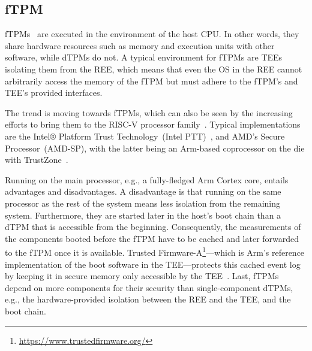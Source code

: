 \subsection{\Acl{fTPM}}



\Acp{fTPM}~\cite{Raj2015, 197213} are executed in the environment of the host CPU\@.
In other words, they share hardware resources such as memory and execution units with other software, while \acp{dTPM} do not.
A typical environment for \acp{fTPM} are \acp{TEE} isolating them from the \ac{REE}, which means that even the OS in the REE cannot arbitrarily access the memory of the \ac{fTPM} but must adhere to the \ac{fTPM}'s and \ac{TEE}'s provided interfaces.

The trend is moving towards fTPMs, which can also be seen by the increasing efforts to bring them to the RISC-V processor family~\cite{Boubakri2021}.
Typical implementations are the Intel® Platform Trust Technology~(Intel PTT)~\cite{intelProcessorSecurity}, and AMD's Secure Processor~(AMD-SP), with the latter being an Arm-based coprocessor on the die with TrustZone~\cite{Khalid2020}.


Running on the main processor, e.g., a fully-fledged Arm Cortex core, entails advantages and disadvantages.
A disadvantage is that running on the same processor as the rest of the system means less isolation from the remaining system.
Furthermore, they are started later in the host's boot chain than a \ac{dTPM} that is accessible from the beginning.
Consequently, the measurements of the components booted before the fTPM have to be cached and later forwarded to the \ac{fTPM} once it is available.
Trusted Firmware-A\footnote{\url{https://www.trustedfirmware.org/}}---which is Arm's reference implementation of the boot software in the \ac{TEE}---protects this cached event log by keeping it in secure memory only accessible by the \ac{TEE}~\cite{tf-a-measured-boot}.
Last, \acp{fTPM} depend on more components for their security than single-component \acp{dTPM}, e.g., the hardware-provided isolation between the \ac{REE} and the \ac{TEE}, and the boot chain.

